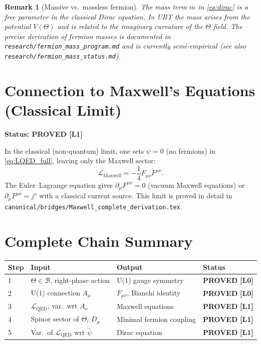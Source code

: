 \documentclass[11pt,a4paper]{article}
\newtheorem{remark}{Remark}
\newcommand{\Lzero}{\textbf{[L0]}}
\newcommand{\Lone}{\textbf{[L1]}}
\newcommand{\PROVED}{\textbf{PROVED}}
\begin{document}
\begin{remark}[Massive vs.\ massless fermion]
The mass term $m$ in \eqref{eq:dirac} is a free parameter in the classical
Dirac equation. In UBT the mass arises from the potential $V(\Theta)$ and is
related to the imaginary curvature of the $\Theta$ field. The precise derivation
of fermion masses is documented in \texttt{research/fermion\_mass\_program.md}
and is currently semi-empirical (see also \texttt{research/fermion\_mass\_status.md}).
\end{remark}

\section{Connection to Maxwell's Equations (Classical Limit)}

\noindent\textbf{Status: \PROVED{} \Lone}

In the classical (non-quantum) limit, one sets $\psi = 0$ (no fermions) in
\eqref{eq:LQED_full}, leaving only the Maxwell sector:
\begin{equation}
  \mathcal{L}_{\mathrm{Maxwell}} = -\frac{1}{4}F_{\mu\nu}F^{\mu\nu}.
\end{equation}
The Euler--Lagrange equation gives
$\partial_\mu F^{\mu\nu} = 0$ (vacuum Maxwell equations)
or $\partial_\mu F^{\mu\nu} = j^\nu$ with a classical current source.
This limit is proved in detail in \texttt{canonical/bridges/Maxwell\_complete\_derivation.tex}.

\section{Complete Chain Summary}

\begin{center}
\begin{tabular}{llll}
\hline
\textbf{Step} & \textbf{Input} & \textbf{Output} & \textbf{Status} \\
\hline
1 & $\Theta \in \mathcal{B}$, right-phase action & U(1) gauge symmetry & \PROVED{} \Lzero \\
2 & U(1) connection $A_\mu$ & $F_{\mu\nu}$, Bianchi identity & \PROVED{} \Lzero \\
3 & $\mathcal{L}_{\mathrm{QED}}$, var.\ wrt $A_\nu$ & Maxwell equations & \PROVED{} \Lone \\
4 & Spinor sector of $\Theta$, $D_\mu$ & Minimal fermion coupling & \PROVED{} \Lone \\
5 & Var.\ of $\mathcal{L}_{\mathrm{QED}}$ wrt $\bar\psi$ & Dirac equation & \PROVED{} \Lone \\
\hline
\end{tabular}
\end{center}
\end{document}
